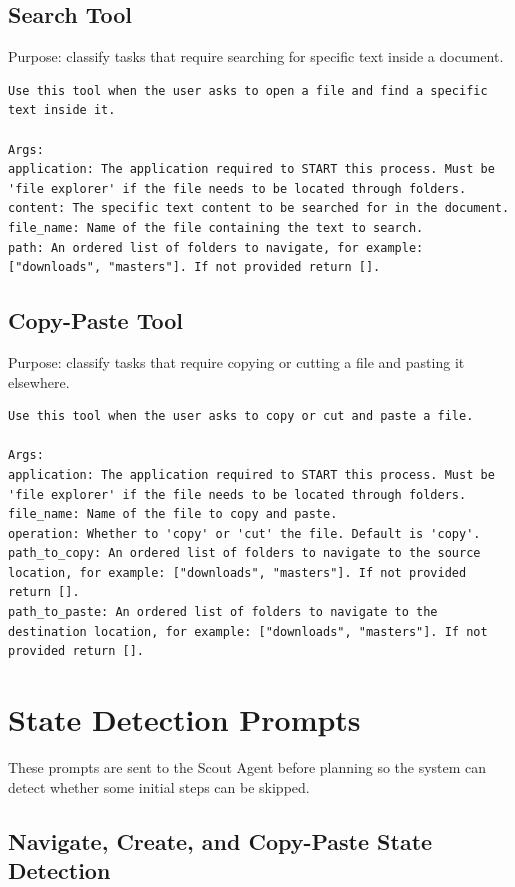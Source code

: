 \subsection{Search Tool}

Purpose: classify tasks that require searching for specific text inside a document.

\begin{lstlisting}
Use this tool when the user asks to open a file and find a specific text inside it.

Args:
application: The application required to START this process. Must be 'file explorer' if the file needs to be located through folders.
content: The specific text content to be searched for in the document.
file_name: Name of the file containing the text to search.
path: An ordered list of folders to navigate, for example: ["downloads", "masters"]. If not provided return [].
\end{lstlisting}

\subsection{Copy-Paste Tool}

Purpose: classify tasks that require copying or cutting a file and pasting it elsewhere.

\begin{lstlisting}
Use this tool when the user asks to copy or cut and paste a file.

Args:
application: The application required to START this process. Must be 'file explorer' if the file needs to be located through folders.
file_name: Name of the file to copy and paste.
operation: Whether to 'copy' or 'cut' the file. Default is 'copy'.
path_to_copy: An ordered list of folders to navigate to the source location, for example: ["downloads", "masters"]. If not provided return [].
path_to_paste: An ordered list of folders to navigate to the destination location, for example: ["downloads", "masters"]. If not provided return [].
\end{lstlisting}

\section{State Detection Prompts}

These prompts are sent to the Scout Agent before planning so the system can detect whether some initial steps can be skipped.

\subsection{Navigate, Create, and Copy-Paste State Detection}


